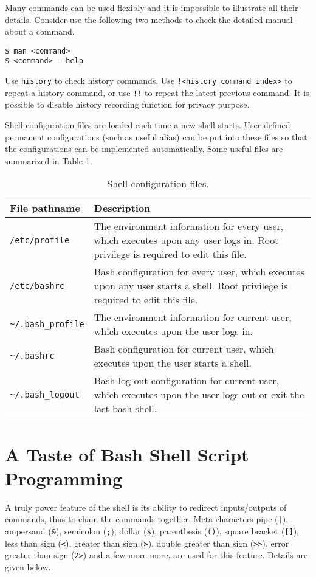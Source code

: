 Many commands can be used flexibly and it is impossible to illustrate all their details. Consider use the following two methods to check the detailed manual about a command.
\begin{lstlisting}
$ man <command>
$ <command> --help
\end{lstlisting}

Use \verb|history| to check history commands. Use \verb|!<history command index>| to repeat a history command, or use \verb|!!| to repeat the latest previous command. It is possible to disable history recording function for privacy purpose.

Shell configuration files are loaded each time a new shell starts. User-defined permanent configurations (such as useful alias) can be put into these files so that the configurations can be implemented automatically. Some useful files are summarized in Table \ref{ch:sb:tab:shellconfig}.

\begin{table}
	\centering \caption{Shell configuration files.}\label{ch:sb:tab:shellconfig}
	\begin{tabularx}{\textwidth}{lX}
		\hline
		File pathname & Description \\ \hline
		\verb|/etc/profile| & The environment information for every user, which executes upon any user logs in. Root privilege is required to edit this file.  \\ \hdashline
		\verb|/etc/bashrc| & Bash configuration for every user, which executes upon any user starts a shell. Root privilege is required to edit this file. \\ \hdashline
		\verb|~/.bash_profile| & The environment information for current user, which executes upon the user logs in. \\ \hdashline
		\verb|~/.bashrc| & Bash configuration for current user, which executes upon the user starts a shell. \\ \hdashline
		\verb|~/.bash_logout| & Bash log out configuration for current user, which executes upon the user logs out or exit the last bash shell. \\ \hline
	\end{tabularx}
\end{table}

\section{A Taste of Bash Shell Script Programming}

A truly power feature of the shell is its ability to redirect inputs/outputs of commands, thus to chain the commands together. Meta-characters pipe (\verb?|?), ampersand (\verb|&|), semicolon (\verb|;|), dollar (\verb|$|), parenthesis (\verb|()|), square bracket (\verb|[]|), less than sign (\verb|<|), greater than sign (\verb|>|), double greater than sign (\verb|>>|), error greater than sign (\verb|2>|) and a few more more, are used for this feature. Details are given below.


